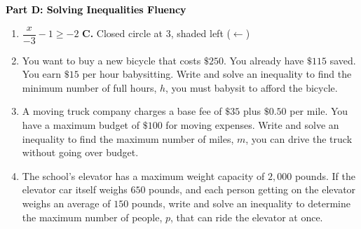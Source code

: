 \documentclass[12pt, letterpaper, fleqn]{article}
\begin{document}
\newpage

\begin{tcolorbox}[colback=customteal!20]
\large\textcolor{black}{\textbf{Part D: Solving Inequalities Fluency}}
\end{tcolorbox}

\vspace{3mm}

\begin{enumerate}[itemsep=2.5cm, leftmargin=0.6cm, resume]
\item $\dfrac{x}{-3} - 1 \ge -2$ \hfill \textbf{C.} Closed circle at $3$, shaded left ($\leftarrow$)
\item You want to buy a new bicycle that costs $\$250$. You already have $\$115$ saved. You earn $\$15$ per hour babysitting. Write and solve an inequality to find the minimum number of full hours, $h$, you must babysit to afford the bicycle.
\item A moving truck company charges a base fee of $\$35$ plus $\$0.50$ per mile. You have a maximum budget of $\$100$ for moving expenses. Write and solve an inequality to find the maximum number of miles, $m$, you can drive the truck without going over budget.
\item The school's elevator has a maximum weight capacity of $2,000$ pounds. If the elevator car itself weighs $650$ pounds, and each person getting on the elevator weighs an average of $150$ pounds, write and solve an inequality to determine the maximum number of people, $p$, that can ride the elevator at once.
\end{enumerate}
\end{document}
